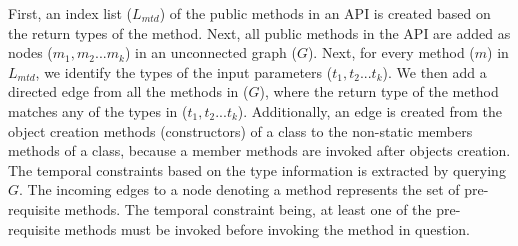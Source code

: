 First, an index list ($L_{mtd}$) of the public methods in an API is created based on the return types of the method.
Next, all public methods in the API are added as nodes ($m_1,m_2...m_k$) in an unconnected graph ($G$).
Next, for every method ($m$) in $L_{mtd}$, we identify the types
of the input parameters ($t_1,t_2...t_k$).
We then add a directed edge from all the methods in ($G$), where the return type of the method matches any of the types in ($t_1,t_2...t_k$). 
Additionally, an edge is created from the object creation methods (constructors) of a class to the non-static members methods of a class, because a member methods are invoked after objects creation. 
The temporal constraints based on the type information is extracted by querying $G$. 
The incoming edges to a node denoting a method represents the set of pre-requisite methods.
The temporal constraint being, at least one of the pre-requisite methods must be invoked before invoking the method in question.


%
%

